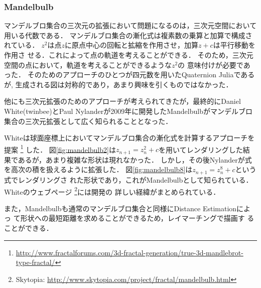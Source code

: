 \subsubsection{Mandelbulb}

マンデルブロ集合の三次元の拡張において問題になるのは，三次元空間において
用いる代数である．
マンデルブロ集合の漸化式は複素数の乗算と加算で構成されている．
$z^2$は点$z$に原点中心の回転と拡縮を作用させ，加算$z + c$は平行移動を作用さ
せる．これによって点の軌道を考えることができる．
そのため，三次元空間の点において，軌道を考えることができるような$z^2$の
意味付けが必要であった．
そのためのアプローチのひとつが四元数を用いたQuaternion Juliaであるが,
生成される図は対称的であり，あまり興味を引くものではなかった．

他にも三次元拡張のためのアプローチが考えられてきたが，最終的にDaniel
White(twinbee)とPaul Nylanderが2009年に開発したMandelbulbがマンデルブロ
集合の三次元拡張として広く知られることとなった．

Whiteは球面座標上においてマンデルブロ集合の漸化式を計算するアプローチを提案
\footnote{\url{http://www.fractalforums.com/3d-fractal-generation/true-3d-mandlebrot-type-fractal/}}
した．
図\ref{fig:mandelbulb2}は$z_{n+1} = z_n^2 + c$を用いてレンダリングした結
果であるが，あまり複雑な形状は現れなかった．
しかし，その後Nylanderが式を高次の積を扱えるように拡張した．
図\ref{fig:mandelbulb8}は$z_{n+1} = z_n^8 + c $という式でレンダリングさ
れた形状であり，これがMandelbulbとして知られている．Whiteのウェブページ
\footnote{Skytopia:
\url{http://www.skytopia.com/project/fractal/mandelbulb.html}}には開発の
詳しい経緯がまとめられている．

また，Mandelbulbも通常のマンデルブロ集合と同様にDistance Estimationによっ
て形状への最短距離を求めることができるため，レイマーチングで描画す
ることができる．

